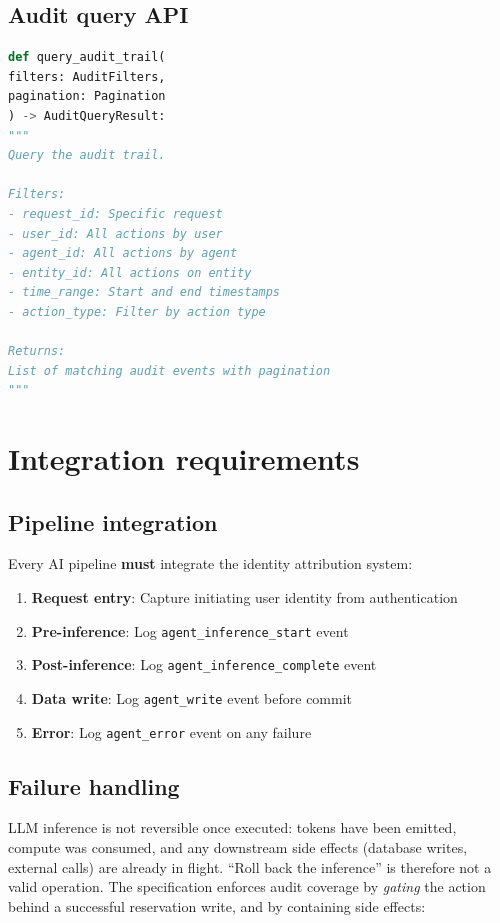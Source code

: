 \documentclass[11pt,a4paper,twoside]{report}
\begin{document}
\subsection{Audit query API}

\begin{lstlisting}[language=Python,basicstyle=\ttfamily\small,caption={Audit query API contract.}]
def query_audit_trail(
filters: AuditFilters,
pagination: Pagination
) -> AuditQueryResult:
"""
Query the audit trail.

Filters:
- request_id: Specific request
- user_id: All actions by user
- agent_id: All actions by agent
- entity_id: All actions on entity
- time_range: Start and end timestamps
- action_type: Filter by action type

Returns:
List of matching audit events with pagination
"""
\end{lstlisting}

\section{Integration requirements}

\subsection{Pipeline integration}

Every AI pipeline \textbf{must} integrate the identity attribution system:

\begin{enumerate}
\item \textbf{Request entry}: Capture initiating user identity from authentication
\item \textbf{Pre-inference}: Log \texttt{agent\_inference\_start} event
\item \textbf{Post-inference}: Log \texttt{agent\_inference\_complete} event
\item \textbf{Data write}: Log \texttt{agent\_write} event before commit
\item \textbf{Error}: Log \texttt{agent\_error} event on any failure
\end{enumerate}

\subsection{Failure handling}\label{sec:audit-failure-handling}

LLM inference is not reversible once executed: tokens have been
emitted, compute was consumed, and any downstream side effects
(database writes, external calls) are already in flight. ``Roll
back the inference'' is therefore not a valid operation. The
specification enforces audit coverage by \emph{gating} the action
behind a successful reservation write, and by containing side
effects:
\end{document}
